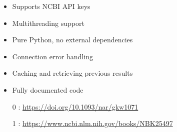 \documentclass[final, a0paper, portrait]{baposter}
\newcommand{\compresslist}{
    \setlength{\itemsep}{1pt}
    \setlength{\parskip}{0pt}
    \setlength{\parsep}{0pt}
}
\begin{document}
\begin{poster}
{
\begin{itemize}
  \small
    \compresslist
    \item Supports NCBI API keys
    \item Multithreading support
    \item Pure Python, no external dependencies
    \item Connection error handling
    \item Caching and retrieving previous results
    \item Fully documented code
  \end{itemize}
}

{
  \begin{itemize}
    \smaller
    \compresslist
    \item [0]: \url{https://doi.org/10.1093/nar/gkw1071}
    \item [1]: \url{https://www.ncbi.nlm.nih.gov/books/NBK25497}
  \end{itemize}

}


\end{poster}
\end{document}
